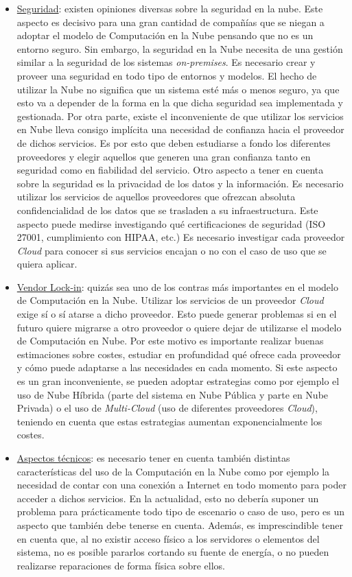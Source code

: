 \documentclass[../../memoria.tex]{subfiles}
\begin{document}
\begin{itemize}
    \item \uline{Seguridad}: existen opiniones diversas sobre la seguridad en la nube. Este aspecto es decisivo para una gran cantidad de compañías que se niegan a adoptar el modelo de Computación en la Nube pensando que no es un entorno seguro. Sin embargo, la seguridad en la Nube necesita de una gestión similar a la seguridad de los sistemas \textit{on-premises}. Es necesario crear y proveer una seguridad en todo tipo de entornos y modelos. El hecho de utilizar la Nube no significa que un sistema esté más o menos seguro, ya que esto va a depender de la forma en la que dicha seguridad sea implementada y gestionada. Por otra parte, existe el inconveniente de que utilizar los servicios en Nube lleva consigo implícita una necesidad de confianza hacia el proveedor de dichos servicios. Es por esto que deben estudiarse a fondo los diferentes proveedores y elegir aquellos que generen una gran confianza tanto en seguridad como en fiabilidad del servicio. Otro aspecto a tener en cuenta sobre la seguridad es la privacidad de los datos y la información. Es necesario utilizar los servicios de aquellos proveedores que ofrezcan absoluta confidencialidad de los datos que se trasladen a su infraestructura. Este aspecto puede medirse investigando qué certificaciones de seguridad (ISO 27001, cumplimiento con HIPAA, etc.) Es necesario investigar cada proveedor \textit{Cloud} para conocer si sus servicios encajan o no con el caso de uso que se quiera aplicar.

    \item \uline{Vendor Lock-in}: quizás sea uno de los contras más importantes en el modelo de Computación en la Nube. Utilizar los servicios de un proveedor \textit{Cloud} exige sí o sí atarse a dicho proveedor. Esto puede generar problemas si en el futuro quiere migrarse a otro proveedor o quiere dejar de utilizarse el modelo de Computación en Nube. Por este motivo es importante realizar buenas estimaciones sobre costes, estudiar en profundidad qué ofrece cada proveedor y cómo puede adaptarse a las necesidades en cada momento. Si este aspecto es un gran inconveniente, se pueden adoptar estrategias como por ejemplo el uso de Nube Híbrida (parte del sistema en Nube Pública y parte en Nube Privada) o el uso de \textit{Multi-Cloud} (uso de diferentes proveedores \textit{Cloud}), teniendo en cuenta que estas estrategias aumentan exponencialmente los costes.

    \item \uline{Aspectos técnicos}: es necesario tener en cuenta también distintas características del uso de la Computación en la Nube como por ejemplo la necesidad de contar con una conexión a Internet en todo momento para poder acceder a dichos servicios. En la actualidad, esto no debería suponer un problema para prácticamente todo tipo de escenario o caso de uso, pero es un aspecto que también debe tenerse en cuenta. Además, es imprescindible tener en cuenta que, al no existir acceso físico a los servidores o elementos del sistema, no es posible pararlos cortando su fuente de energía, o no pueden realizarse reparaciones de forma física sobre ellos.
\end{itemize}
\end{document}
